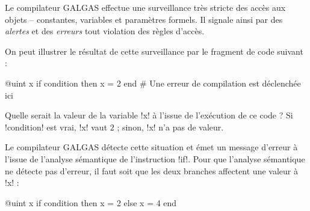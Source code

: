 
Le compilateur GALGAS effectue une surveillance très stricte des accès aux objets -- constantes, variables et paramètres formels. Il signale ainsi par des \emph{alertes} et des \emph{erreurs} tout violation des règles d'accès.

On peut illustrer le résultat de cette surveillance par le fragment de code suivant :
\begin{galgas}
@uint x
if condition then
  x = 2
end # Une erreur de compilation est déclenchée ici
\end{galgas}

Quelle serait la valeur de la variable \ggs!x! à l'issue de l'exécution de ce code ? Si \ggs!condition! est vrai, \ggs!x! vaut $2$ ; sinon, \ggs!x! n'a pas de valeur.

Le compilateur GALGAS détecte cette situation et émet un message d'erreur à l'issue de l'analyse sémantique de l'instruction \ggs!if!. Pour que l'analyse sémantique ne détecte pas d'erreur, il faut soit que les deux branches affectent une valeur à \ggs!x! :

\begin{galgas}
@uint x
if condition then
  x = 2
else
  x = 4
end
\end{galgas}












